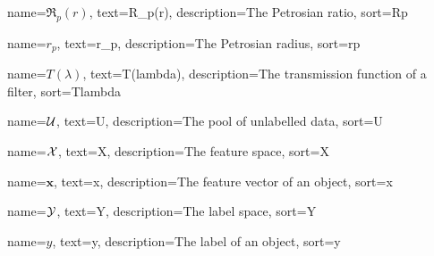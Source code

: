 %
{%
	name={$\mathfrak{R}_p(r)$},
	text={R_p(r)},
	description={The Petrosian ratio},
	sort={Rp}
}

%
{%
	name={$r_p$},
	text={r_p},
	description={The Petrosian radius},
	sort={rp}
}


%
{%
	name={$T(\lambda)$},
	text={T(lambda)},
	description={The transmission function of a filter},
	sort={Tlambda}
}

%
{%
	name={$\mathcal{U}$},
	text={U},
	description={The pool of unlabelled data},
	sort={U}
}

%
{%
	name={$\mathcal{X}$},
	text={X},
	description={The feature space},
	sort={X}
}

%
{%
	name={$\bm{x}$},
	text={x},
	description={The feature vector of an object},
	sort={x}
}

%
{%
	name={$\mathcal{Y}$},
	text={Y},
	description={The label space},
	sort={Y}
}

%
{%
	name={$y$},
	text={y},
	description={The label of an object},
	sort={y}
}



